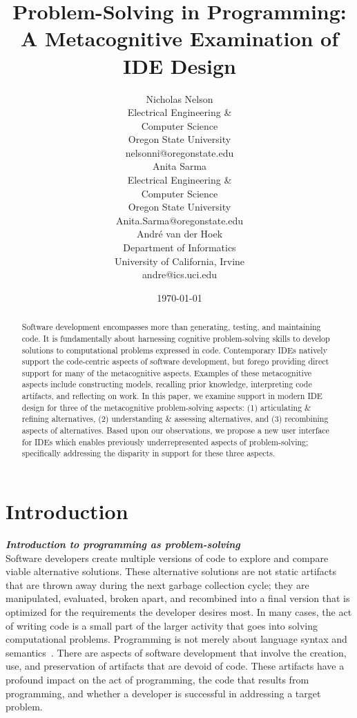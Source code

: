 \documentclass{ppig}
\title{Problem-Solving in Programming: A Metacognitive Examination of IDE Design}
\author{Nicholas Nelson \\
  Electrical Engineering \&\\ Computer Science \\
  Oregon State University \\
  nelsonni@oregonstate.edu \\
  \And
  Anita Sarma \\
  Electrical Engineering \&\\ Computer Science \\
  Oregon State University \\
  Anita.Sarma@oregonstate.edu \\
  \And
  André van der Hoek \\
  Department of Informatics \\
  University of California, Irvine \\
  andre@ics.uci.edu
}
\date{\today}
\newcommand{\bold}[1]{\textit{\textbf{\color{aoblue}#1}}}
\begin{document}
\maketitle
\thispagestyle{empty}

\begin{abstract}

Software development encompasses more than generating, testing, and maintaining code.
It is fundamentally about harnessing cognitive problem-solving skills to develop solutions to computational problems expressed in code.
Contemporary IDEs natively support the code-centric aspects of software development, but forego providing direct support for many of the metacognitive aspects.
Examples of these metacognitive aspects include constructing models, recalling prior knowledge, interpreting code artifacts, and reflecting on work.
In this paper, we examine support in modern IDE design for three of the metacognitive problem-solving aspects: (1) articulating \& refining alternatives, (2) understanding \& assessing alternatives, and (3) recombining aspects of alternatives.
Based upon our observations, we propose a new user interface for IDEs which enables previously underrepresented aspects of problem-solving; specifically addressing the disparity in support for these three aspects. 
\end{abstract}

\section{Introduction}
\bold{Introduction to programming as problem-solving\\}
Software developers create multiple versions of code to explore and compare viable alternative solutions.
These alternative solutions are not static artifacts that are thrown away during the next garbage collection cycle; they are manipulated, evaluated, broken apart, and recombined into a final version that is optimized for the requirements the developer desires most.
In many cases, the act of writing code is a small part of the larger activity that goes into solving computational problems.
Programming is not merely about language syntax and semantics~\cite{loksa2016programming}.
There are aspects of software development that involve the creation, use, and preservation of artifacts that are devoid of code.
These artifacts have a profound impact on the act of programming, the code that results from programming, and whether a developer is successful in addressing a target problem.
\end{document}
